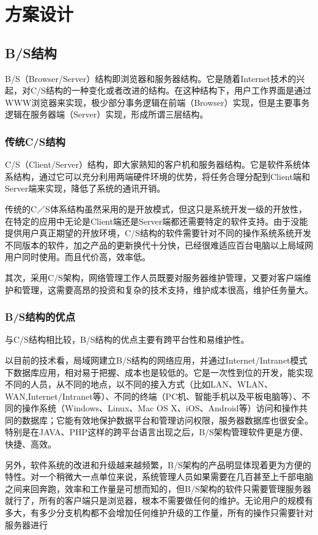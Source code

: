 
\chapter{方案设计}
\section{B/S结构}

B/S（Browser/Server）结构即浏览器和服务器结构。它是随着Internet技术的兴起，对C/S结构的一种变化或者改进的结构。在这种结构下，用户工作界面是通过WWW浏览器来实现，极少部分事务逻辑在前端（Browser）实现，但是主要事务逻辑在服务器端（Server）实现，形成所谓三层结构。

\subsection{传统C/S结构}
C/S（Client/Server）结构，即大家熟知的客户机和服务器结构。它是软件系统体系结构，通过它可以充分利用两端硬件环境的优势，将任务合理分配到Client端和Server端来实现，降低了系统的通讯开销。

传统的C／S体系结构虽然采用的是开放模式，但这只是系统开发一级的开放性，在特定的应用中无论是Client端还是Server端都还需要特定的软件支持。由于没能提供用户真正期望的开放环境，C/S结构的软件需要针对不同的操作系统系统开发不同版本的软件，加之产品的更新换代十分快，已经很难适应百台电脑以上局域网用户同时使用。而且代价高，效率低。

其次，采用C/S架构，网络管理工作人员既要对服务器维护管理，又要对客户端维护和管理，这需要高昂的投资和复杂的技术支持，维护成本很高，维护任务量大。

\subsection{B/S结构的优点}
与C/S结构相比较，B/S结构的优点主要有跨平台性和易维护性。

以目前的技术看，局域网建立B/S结构的网络应用，并通过Internet/Intranet模式下数据库应用，相对易于把握、成本也是较低的。它是一次性到位的开发，能实现不同的人员，从不同的地点，以不同的接入方式（比如LAN、WLAN、WAN,Internet/Intranet等）、不同的终端（PC机、智能手机以及平板电脑等）、不同的操作系统（Windows、Linux、Mac OS X、iOS、Android等）访问和操作共同的数据库；它能有效地保护数据平台和管理访问权限，服务器数据库也很安全。特别是在JAVA、PHP这样的跨平台语言出现之后，B/S架构管理软件更是方便、快捷、高效。

另外，软件系统的改进和升级越来越频繁，B/S架构的产品明显体现着更为方便的特性。对一个稍微大一点单位来说，系统管理人员如果需要在几百甚至上千部电脑之间来回奔跑，效率和工作量是可想而知的，但B/S架构的软件只需要管理服务器就行了，所有的客户端只是浏览器，根本不需要做任何的维护。无论用户的规模有多大，有多少分支机构都不会增加任何维护升级的工作量，所有的操作只需要针对服务器进行

